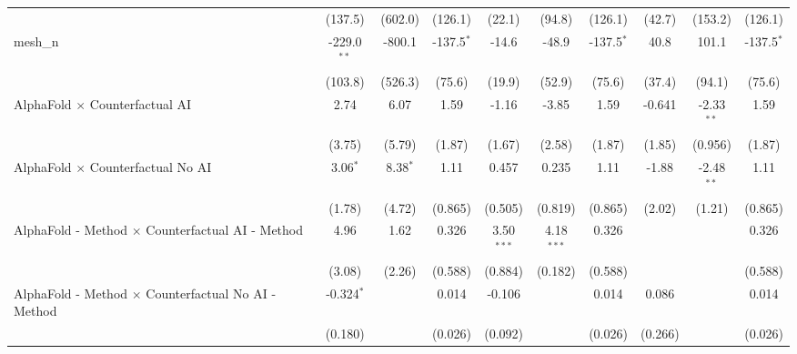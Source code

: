 \begin{tabular}{lccccccccc}
                                                               & (137.5)          & (602.0)         & (126.1)        & (22.1)        & (94.8)        & (126.1)        & (42.7)        & (153.2)       & (126.1)\\   
   mesh\_n                                                     & -229.0$^{**}$    & -800.1          & -137.5$^{*}$   & -14.6         & -48.9         & -137.5$^{*}$   & 40.8          & 101.1         & -137.5$^{*}$\\   
                                                               & (103.8)          & (526.3)         & (75.6)         & (19.9)        & (52.9)        & (75.6)         & (37.4)        & (94.1)        & (75.6)\\   
   AlphaFold $\times$ Counterfactual AI                        & 2.74             & 6.07            & 1.59           & -1.16         & -3.85         & 1.59           & -0.641        & -2.33$^{**}$  & 1.59\\   
                                                               & (3.75)           & (5.79)          & (1.87)         & (1.67)        & (2.58)        & (1.87)         & (1.85)        & (0.956)       & (1.87)\\   
   AlphaFold $\times$ Counterfactual No AI                     & 3.06$^{*}$       & 8.38$^{*}$      & 1.11           & 0.457         & 0.235         & 1.11           & -1.88         & -2.48$^{**}$  & 1.11\\   
                                                               & (1.78)           & (4.72)          & (0.865)        & (0.505)       & (0.819)       & (0.865)        & (2.02)        & (1.21)        & (0.865)\\   
   AlphaFold - Method $\times$ Counterfactual AI - Method      & 4.96             & 1.62            & 0.326          & 3.50$^{***}$  & 4.18$^{***}$  & 0.326          &               &               & 0.326\\   
                                                               & (3.08)           & (2.26)          & (0.588)        & (0.884)       & (0.182)       & (0.588)        &               &               & (0.588)\\   
   AlphaFold - Method $\times$ Counterfactual No AI - Method   & -0.324$^{*}$     &                 & 0.014          & -0.106        &               & 0.014          & 0.086         &               & 0.014\\   
                                                               & (0.180)          &                 & (0.026)        & (0.092)       &               & (0.026)        & (0.266)       &               & (0.026)\\   

\end{tabular}
